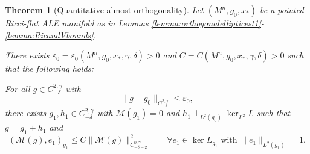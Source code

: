 \documentclass[12pt]{amsart}
\newcommand{\calM}{\mathcal{M}}
\renewcommand{\1}{{\mathbf 1}}
\newcommand{\eps}{{\varepsilon}}
\newtheorem{thm}{Theorem}[section]
\theoremstyle{others}
\numberwithin{equation}{section}
\begin{document}
\begin{thm}[Quantitative almost-orthogonality]\label{thm:ALEalmostorthog} 
    Let $(M^n, g_0, x_*)$ be a pointed Ricci-flat ALE manifold as in Lemmas \ref{lemma:orthogonalellipticest1}-\ref{lemma:RicandVbounds}.

    There exists $\eps_0 = \eps_0 (M^n, g_0, x_*, \gamma, \delta) > 0$ and $C = C(M^n, g_0, x_*, \gamma, \delta) > 0$ such that the following holds:

    For all $g \in C^{2, \gamma}_{-\delta}$ with
        $$\| g - g_0 \|_{C^{2, \gamma}_{-\delta}} \le \eps_0,$$
    there exists $g_1, h_1 \in C^{2, \gamma}_{-\delta}$ with $\mathcal M (g_1) = 0$ and $h_1 \perp_{L^2(g_0)} \ker_{L^2} L $ such that $g= g_1 + h_1$ and
    \begin{equation}
        ( \calM(g), e_1 )_{g_1} \leq C \|\calM(g) \|_{C^{0, \gamma}_{-\delta-2} }^2
        \qquad \forall e_1 \in \ker L_{g_1} \text{ with } \| e_1 \|_{L^2(g_1)} = 1.
    \end{equation}
\end{thm}
\end{document}
